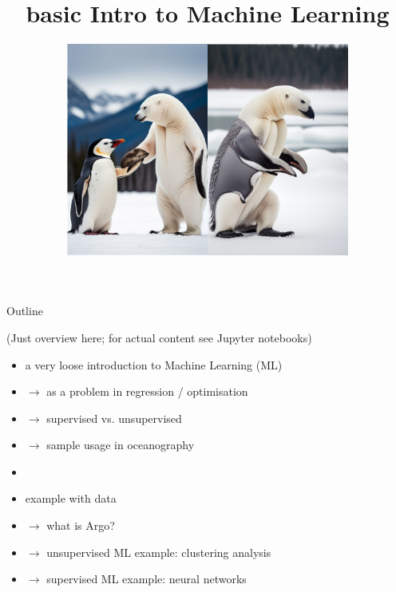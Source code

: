 \documentclass[xcolor=x11names,compress]{beamer}
\title{{\tiny basic} Intro to Machine Learning}
\author%
{}
\subtitle{\vspace*{5mm} \includegraphics[width=0.7\textwidth]{penguinbear}}
\date{}
\renewcommand{\(}{\begin{columns}}
\renewcommand{\)}{\end{columns}}
\newcommand{\<}[1]{\begin{column}{#1}}
\renewcommand{\>}{\end{column}}
\begin{document}
\maketitle


\begin{frame}{Outline}

{\scriptsize (Just overview here; for actual content see Jupyter notebooks)}

\begin{itemize}
  \item a very loose introduction to Machine Learning (ML)
  \item[] $\to$ as a problem in regression / optimisation
  \item[] $\to$ supervised vs. unsupervised
  \item[] $\to$ sample usage in oceanography
  \item[]
  \item example with  data
  \item[] $\to$ what is Argo?
  \item[] $\to$ unsupervised ML example: clustering analysis
  \item[] $\to$ supervised ML example: neural networks
\end{itemize}

\end{frame}

\end{document}
